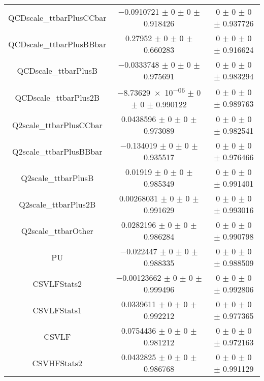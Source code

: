 \begin{table}
\begin{tabular}{ccc}
QCDscale\_ttbarPlusCCbar & \num{-0.0910721} $\pm$ \num{0} $\pm$ \num{0} $\pm$ \num{0.918426} & \num{0} $\pm$ \num{0} $\pm$ \num{0} $\pm$ \num{0.937726}\\
QCDscale\_ttbarPlusBBbar & \num{0.27952} $\pm$ \num{0} $\pm$ \num{0} $\pm$ \num{0.660283} & \num{0} $\pm$ \num{0} $\pm$ \num{0} $\pm$ \num{0.916624}\\
QCDscale\_ttbarPlusB & \num{-0.0333748} $\pm$ \num{0} $\pm$ \num{0} $\pm$ \num{0.975691} & \num{0} $\pm$ \num{0} $\pm$ \num{0} $\pm$ \num{0.983294}\\
QCDscale\_ttbarPlus2B & \num{-8.73629e-06} $\pm$ \num{0} $\pm$ \num{0} $\pm$ \num{0.990122} & \num{0} $\pm$ \num{0} $\pm$ \num{0} $\pm$ \num{0.989763}\\
Q2scale\_ttbarPlusCCbar & \num{0.0438596} $\pm$ \num{0} $\pm$ \num{0} $\pm$ \num{0.973089} & \num{0} $\pm$ \num{0} $\pm$ \num{0} $\pm$ \num{0.982541}\\
Q2scale\_ttbarPlusBBbar & \num{-0.134019} $\pm$ \num{0} $\pm$ \num{0} $\pm$ \num{0.935517} & \num{0} $\pm$ \num{0} $\pm$ \num{0} $\pm$ \num{0.976466}\\
Q2scale\_ttbarPlusB & \num{0.01919} $\pm$ \num{0} $\pm$ \num{0} $\pm$ \num{0.985349} & \num{0} $\pm$ \num{0} $\pm$ \num{0} $\pm$ \num{0.991401}\\
Q2scale\_ttbarPlus2B & \num{0.00268031} $\pm$ \num{0} $\pm$ \num{0} $\pm$ \num{0.991629} & \num{0} $\pm$ \num{0} $\pm$ \num{0} $\pm$ \num{0.993016}\\
Q2scale\_ttbarOther & \num{0.0282196} $\pm$ \num{0} $\pm$ \num{0} $\pm$ \num{0.986284} & \num{0} $\pm$ \num{0} $\pm$ \num{0} $\pm$ \num{0.990798}\\
PU & \num{-0.022447} $\pm$ \num{0} $\pm$ \num{0} $\pm$ \num{0.988335} & \num{0} $\pm$ \num{0} $\pm$ \num{0} $\pm$ \num{0.988509}\\
CSVLFStats2 & \num{-0.00123662} $\pm$ \num{0} $\pm$ \num{0} $\pm$ \num{0.999496} & \num{0} $\pm$ \num{0} $\pm$ \num{0} $\pm$ \num{0.992806}\\
CSVLFStats1 & \num{0.0339611} $\pm$ \num{0} $\pm$ \num{0} $\pm$ \num{0.992212} & \num{0} $\pm$ \num{0} $\pm$ \num{0} $\pm$ \num{0.977365}\\
CSVLF & \num{0.0754436} $\pm$ \num{0} $\pm$ \num{0} $\pm$ \num{0.981212} & \num{0} $\pm$ \num{0} $\pm$ \num{0} $\pm$ \num{0.972163}\\
CSVHFStats2 & \num{0.0432825} $\pm$ \num{0} $\pm$ \num{0} $\pm$ \num{0.986768} & \num{0} $\pm$ \num{0} $\pm$ \num{0} $\pm$ \num{0.991129}\\

\end{tabular}
\end{table}

